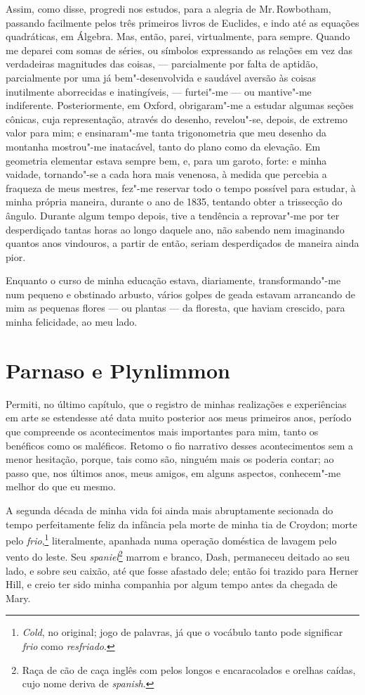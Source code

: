 Assim, como disse, progredi nos estudos, para a alegria de Mr.\,Rowbotham, passando facilmente pelos três primeiros livros de Euclides,
e indo até as equações quadráticas, em Álgebra. Mas, então, parei,
virtualmente, para sempre. Quando me deparei com somas de séries, ou
símbolos expressando as relações em vez das verdadeiras magnitudes das
coisas, --- parcialmente por falta de aptidão, parcialmente por uma já
bem"-desenvolvida e saudável aversão às coisas inutilmente aborrecidas e
inatingíveis, --- furtei"-me --- ou mantive"-me indiferente. Posteriormente,
em Oxford, obrigaram"-me a estudar algumas seções cônicas, cuja
representação, através do desenho, revelou"-se, depois, de extremo valor
para mim; e ensinaram"-me tanta trigonometria que meu desenho da montanha
mostrou"-me inatacável, tanto do plano como da elevação. Em geometria
elementar estava sempre bem, e, para um garoto, forte: e minha vaidade,
tornando"-se a cada hora mais venenosa, à medida que percebia a fraqueza
de meus mestres, fez"-me reservar todo o tempo possível para estudar, à
minha própria maneira, durante o ano de 1835, tentando obter a
trissecção do ângulo. Durante algum tempo depois, tive a tendência a
reprovar"-me por ter desperdiçado tantas horas ao longo daquele ano, não
sabendo nem imaginando quantos anos vindouros, a partir de então, seriam
desperdiçados de maneira ainda pior.

Enquanto o curso de minha educação estava, diariamente, transformando"-me
num pequeno e obstinado arbusto, vários golpes de geada estavam
arrancando de mim as pequenas flores --- ou plantas --- da floresta, que
haviam crescido, para minha felicidade, ao meu lado.

\chapter{Parnaso e Plynlimmon} %

Permiti, no último capítulo, que o registro de minhas realizações e
experiências em arte se estendesse até data muito posterior aos meus
primeiros anos, período que compreende os acontecimentos mais
importantes para mim, tanto os benéficos como os maléficos. Retomo o fio
narrativo desses acontecimentos sem a menor hesitação, porque, tais como
são, ninguém mais os poderia contar; ao passo que, nos últimos anos,
meus amigos, em alguns aspectos, conhecem"-me melhor do que eu mesmo.

A segunda década de minha vida foi ainda mais abruptamente secionada do
tempo perfeitamente feliz da infância pela morte de minha tia de
Croydon; morte pelo \textit{frio},\footnote{\textit{Cold}, no original; jogo de
  palavras, já que o vocábulo tanto pode significar \textit{frio} como
  \textit{resfriado}.} literalmente, apanhada numa operação
doméstica de lavagem pelo vento do leste. Seu \textit{spaniel}\footnote{Raça
  de cão de caça inglês com pelos longos e encaracolados e orelhas
  caídas, cujo nome deriva de \textit{spanish}.} marrom e
branco, Dash, permaneceu deitado ao seu lado, e sobre seu caixão, até
que fosse afastado dele; então foi trazido para Herner Hill, e creio ter
sido minha companhia por algum tempo antes da chegada de Mary.

